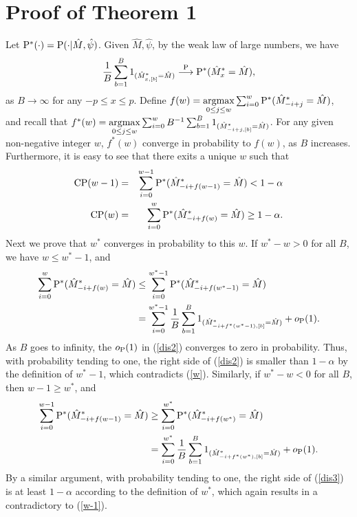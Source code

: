 \documentclass[10pt]{book}
\theoremstyle{definition}
\begin{document}
\section{Proof of Theorem 1}
Let ${\rm P}^*(\cdot)={\rm P}(\cdot|\hat{M}, \hat{\psi})$. Given $\hat{M}, \hat{\psi}$, by the weak law of large numbers, we have
\begin{eqnarray}
    \frac{1}{B}\sum_{b=1}^B 1_{(\hat{M}^*_{x,[b]}=\hat{M} )}\stackrel{\rm P}{\longrightarrow} {\rm P^*}(\hat{M}^*_{x}=\hat{M}),
\end{eqnarray}
 as $B\rightarrow\infty$ for any $-p\leq x \leq p$. Define
 $f(w) = \mathop{\mathrm{argmax}}\limits_{0\leq j \leq w} \sum_{i=0}^{w}{\rm P^*}(\hat{M}^*_{-i+j}=\hat{M})$, and recall that
 $f^*(w)= \mathop{\mathrm{argmax}}\limits_{0\leq j \leq w} \sum_{i=0}^{w}B^{-1}\sum_{b=1}^{B} 1_{(\hat{M}^*_{-i+j,[b]}=\hat{M} )}$.
 For any given non-negative integer $w$, $f^*(w)$ converge in probability to $f(w)$, as $B$ increases. Furthermore, it is easy to see that there exits a unique $w$ such that 
 \begin{eqnarray}
    {\rm CP}(w-1)&=&\sum_{i=0}^{w-1}{\rm P^*}(\hat{M}^*_{-i+f(w-1)}=\hat{M})<1-\alpha \label{w-1}\\
   {\rm CP}(w)&=& \sum_{i=0}^{w}{\rm P^*}(\hat{M}^*_{-i+f(w)}=\hat{M})\geq1-\alpha.\label{w}
 \end{eqnarray}
 Next we prove that $w^*$ converges in probability to this $w$. If $w^*-w>0$ for all $B$, we have $w \leq w^*-1$, and
 \begin{align}
      \sum_{i=0}^{w}{\rm P}^*(\hat{M}^*_{-i+f(w)}= \hat{M})&\leq \sum_{i=0}^{w^*-1}{\rm P}^*(\hat{M}^*_{-i+f(w^*-1)}= \hat{M})\nonumber\\
       &= \sum_{i=0}^{w^*-1}\frac{1}{B}\sum_{b=1}^B 1_{(\hat{M}^*_{-i+f^*(w^*-1),[b]}= \hat{M})}+o_{\rm P}(1).\label{dis2}
 \end{align}
 As $B$ goes to infinity, the $o_{\rm P}(1)$ in (\ref{dis2}) converges to zero in probability. Thus, with probability tending to one, the right side of (\ref{dis2}) is smaller than $1-\alpha$ by the definition of $w^*-1$, which contradicts (\ref{w}). Similarly, if $w^*-w<0$ for all $B$, then $w-1 \geq w^*$, and
 \begin{align}
      \sum_{i=0}^{w-1}{\rm P}^*(\hat{M}^*_{-i+f(w-1)}= \hat{M})&\geq \sum_{i=0}^{w^*}{\rm P}^*(\hat{M}^*_{-i+f(w^*)}= \hat{M})\nonumber\\
       &= \sum_{i=0}^{w^*}\frac{1}{B}\sum_{b=1}^B1_{(\hat{M}^*_{-i+f^*(w^*),[b]}= \hat{M})}+o_{\rm P}(1).\label{dis3}
 \end{align}
By a similar argument, with probability tending to one, the right side of (\ref{dis3}) is at least $1-\alpha$ according to the definition of $w^*$, which again results in a contradictory to (\ref{w-1}).
\end{document}
